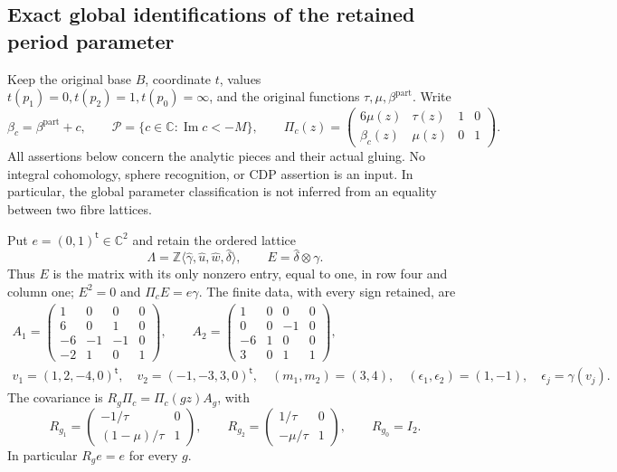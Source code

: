 \subsection{Exact global identifications of the retained period parameter}
\label{pshift:sec:classification}

Keep the original base $B$, coordinate $t$, values
$t(p_1)=0,t(p_2)=1,t(p_0)=\infty$, and the original functions
$\tau,\mu,\beta^{\mathrm{part}}$. Write
\[
 \beta_c=\beta^{\mathrm{part}}+c,\qquad
 \mathcal P=\{c\in\mathbb C:\operatorname{Im}c<-M\},\qquad
 \Pi_c(z)=\begin{pmatrix}6\mu(z)&\tau(z)&1&0\\
                      \beta_c(z)&\mu(z)&0&1\end{pmatrix}.
 \tag{PS1}\label{pshift:eq:periods}
\]
All assertions below concern the analytic pieces and their actual gluing.
No integral cohomology, sphere recognition, or CDP assertion is an input.
In particular, the global parameter classification is not inferred from
an equality between two fibre lattices.

Put $e=(0,1)^{\mathsf t}\in\mathbb C^2$ and retain the ordered lattice
\[
 \Lambda=\mathbb Z\langle\widehat\gamma,\widehat u,
                        \widehat w,\widehat\delta\rangle,
 \qquad E=\widehat\delta\otimes\gamma.
 \tag{PS2}\label{pshift:eq:rank-one-map}
\]
Thus $E$ is the matrix with its only nonzero entry, equal to one, in
row four and column one; $E^2=0$ and $\Pi_cE=e\gamma$.
The finite data, with every sign retained, are
\[
\begin{gathered}
 A_1=\begin{pmatrix}1&0&0&0\\6&0&1&0\\-6&-1&-1&0\\-2&1&0&1\end{pmatrix},
 \qquad
 A_2=\begin{pmatrix}1&0&0&0\\0&0&-1&0\\-6&1&0&0\\3&0&1&1\end{pmatrix},\\
 v_1=(1,2,-4,0)^{\mathsf t},\quad
 v_2=(-1,-3,3,0)^{\mathsf t},\quad
 (m_1,m_2)=(3,4),\quad
 (\epsilon_1,\epsilon_2)=(1,-1),\quad \epsilon_j=\gamma(v_j).
\end{gathered}
\tag{PS3}\label{pshift:eq:finite-data}
\]
The covariance is $R_g\Pi_c=\Pi_c(gz)A_g$, with
\[
 R_{g_1}=\begin{pmatrix}-1/\tau&0\\(1-\mu)/\tau&1\end{pmatrix},\qquad
 R_{g_2}=\begin{pmatrix}1/\tau&0\\-\mu/\tau&1\end{pmatrix},\qquad
 R_{g_0}=I_2.
 \tag{PS4}\label{pshift:eq:covariance}
\]
In particular $R_ge=e$ for every $g$.

